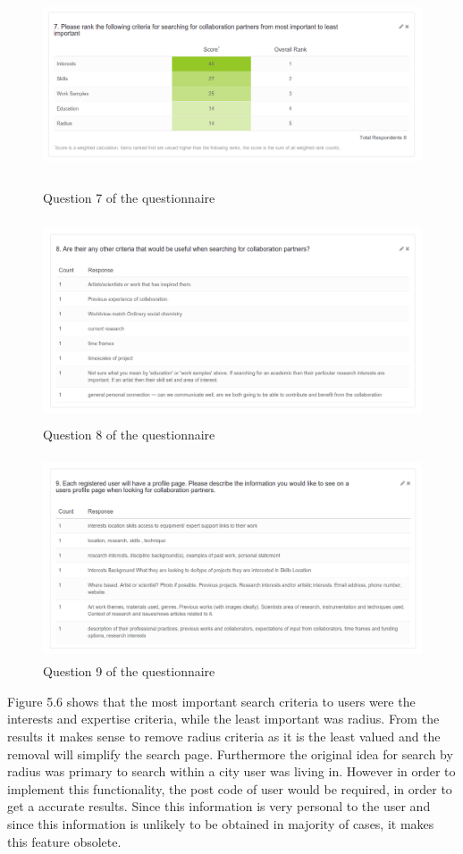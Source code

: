 \documentclass[a4paper,oneside,11pt]{report}
\begin{document}
\begin{figure}[!ht]
\centering
\includegraphics[width=\textwidth,height=6cm]{questionnaire-iteration-1-q7.png}
\caption{Question 7 of the questionnaire}
\end{figure}
\begin{figure}[!ht]
\centering
\includegraphics[width=\textwidth,height=6cm]{questionnaire-iteration-1-q8.png}
\caption{Question 8 of the questionnaire}
\end{figure}
\begin{figure}[!ht]
\centering
\includegraphics[width=\textwidth,height=6cm]{questionnaire-iteration-1-q9.png}
\caption{Question 9 of the questionnaire}
\end{figure}
\newpage
Figure 5.6 shows that the most important search criteria to users were the interests and expertise criteria, while the least important was radius. From the results it makes sense to remove radius criteria as it is the least valued and the removal will simplify the search page. Furthermore the original idea for search by radius was primary to search within a city user was living in. However in order to implement this functionality, the post code of user would be required, in order to get a accurate results. Since this information is very personal to the user and since this information is unlikely to be obtained in majority of cases, it makes this feature obsolete.
\end{document}
